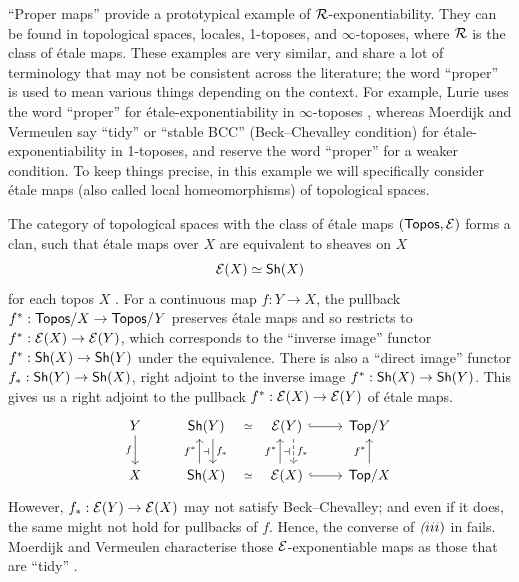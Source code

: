 \begin{example}
  \label{ex:topos-etale}
  ``Proper maps'' provide a prototypical example of $\mathcal{R}$-exponentiability.
  They can be found in topological spaces, locales, 1-toposes,
  and $\infty$-toposes, where $\mathcal{R}$ is the class of \'etale maps.
  These examples are very similar,
  and share a lot of terminology that may not be consistent across the literature;
  the word ``proper'' is used to mean various things
  depending on the context.
  For example, Lurie uses the word ``proper'' for \'etale-exponentiability
  in $\infty$-toposes \cite[Definition 7.3.1.4]{lurie2009},
  whereas Moerdijk and Vermeulen say ``tidy'' \cite[III Definition 1.2]{moerdijk2000proper}
  or ``stable BCC'' (Beck--Chevalley condition) for \'etale-exponentiability in 1-toposes,
  and reserve the word ``proper'' for a weaker condition.
  To keep things precise,
  in this example we will specifically consider \'etale maps
  (also called local homeomorphisms)
  of topological spaces.
  
  The category of topological spaces with the class of
  \'etale maps $(\mathsf{Topos},\mathcal{E})$ forms a clan,
  such that \'etale maps over $X$ are
  equivalent to sheaves on $X$
  \[\mathcal{E}(X) \simeq \mathsf{Sh}(X)\]
  for each topos $X$ \cite[Section II.6]{maclane2012}.
  For a continuous map $f : Y \to X$,
  the pullback $f^* : \mathsf{Topos}/X \to \mathsf{Topos}/Y$ preserves \'etale maps
  and so restricts to $f^* : \mathcal{E}(X) \to \mathcal{E}(Y)$,
  which corresponds to the ``inverse image'' functor $f^* : \mathsf{Sh}(X) \to \mathsf{Sh}(Y)$
  under the equivalence.
  There is also a ``direct image''
  functor $f_* : \mathsf{Sh}(Y) \to \mathsf{Sh}(X)$, right adjoint to
  the inverse image $f^*  : \mathsf{Sh}(X) \to \mathsf{Sh}(Y)$.
  This gives us a right adjoint to the pullback $f^* : \mathcal{E}(X) \to \mathcal{E}(Y)$
  of \'etale maps.
  \[ \begin{tikzcd}
    Y & {\Sh(Y)} & {\EE(Y)} & {\Top / Y} \\
    X & {\Sh(X)} & {\EE(X)} & {\Top / X}
    \arrow["f"', from=1-1, to=2-1]
    \arrow["\simeq"{description}, draw=none, from=1-2, to=1-3]
    \arrow[""{name=0, anchor=center, inner sep=0}, "{f_*}", shift left=2, from=1-2, to=2-2]
    \arrow[hook, from=1-3, to=1-4]
    \arrow[""{name=1, anchor=center, inner sep=0}, "{f_*}", shift left=2, dashed, from=1-3, to=2-3]
    \arrow[""{name=2, anchor=center, inner sep=0}, "{f^*}", shift left=2, from=2-2, to=1-2]
    \arrow[""{name=3, anchor=center, inner sep=0}, "{f^*}", shift left=2, from=2-3, to=1-3]
    \arrow["\simeq"{description}, draw=none, from=2-3, to=2-2]
    \arrow[hook, from=2-3, to=2-4]
    \arrow["{f^*}", from=2-4, to=1-4]
    \arrow["\dashv"{anchor=center}, draw=none, from=2, to=0]
    \arrow["\dashv"{anchor=center}, draw=none, from=3, to=1]
  \end{tikzcd}\]
  However, $f_* : \mathcal{E}(Y) \to \mathcal{E}(X)$ may not satisfy Beck--Chevalley;
  and even if it does, the same might not hold for pullbacks of $f$.
  Hence, the converse of $\textit(iii)$ in  fails.
  Moerdijk and Vermeulen characterise those $\mathcal{E}$-exponentiable maps
  as those that are ``tidy'' \cite[III, Corollary 4.9]{moerdijk2000proper}.
\end{example}


